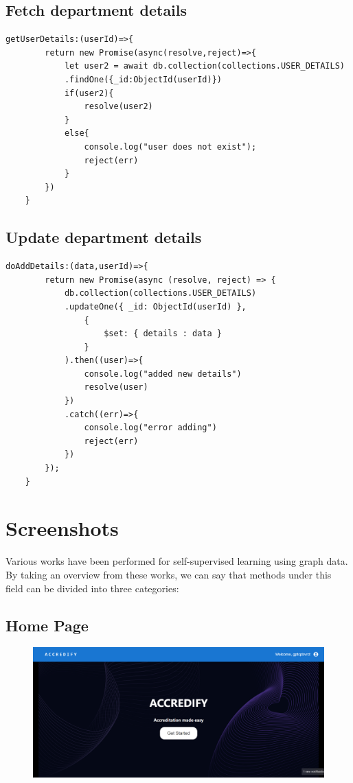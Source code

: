 \documentclass[a4paper,11pt]{report}
\begin{document}
\section{Fetch department details}
\begin{verbatim}
getUserDetails:(userId)=>{
        return new Promise(async(resolve,reject)=>{
            let user2 = await db.collection(collections.USER_DETAILS)
            .findOne({_id:ObjectId(userId)})
            if(user2){
                resolve(user2)
            }
            else{
                console.log("user does not exist");
                reject(err)
            }
        })
    }
\end{verbatim}

\section{Update department details}
\begin{verbatim}
doAddDetails:(data,userId)=>{
        return new Promise(async (resolve, reject) => {
            db.collection(collections.USER_DETAILS)
            .updateOne({ _id: ObjectId(userId) },
                { 
                    $set: { details : data } 
                }
            ).then((user)=>{
                console.log("added new details")
                resolve(user)
            })
            .catch((err)=>{
                console.log("error adding")
                reject(err)
            })
        });
    }
\end{verbatim}

\chapter{Screenshots}

Various works have been performed for self-supervised learning using graph data. By taking an overview from these works, we can say that methods under this field can be divided into three categories:

\section{Home Page}
\begin{figure}[h]
	\centering
	\hspace{21pt}
	\includegraphics[width=.70\linewidth]{accredify0.png}
	\label{fig:logo.png}
\end{figure}
\end{document}
